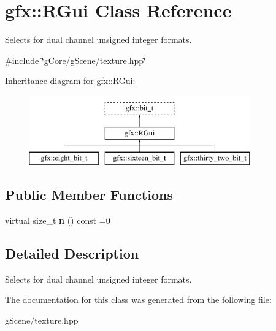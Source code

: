 \hypertarget{classgfx_1_1RGui}{\section{gfx\-:\-:R\-Gui Class Reference}
\label{classgfx_1_1RGui}
}


Selects for dual channel unsigned integer formats.  




{\ttfamily \#include \char`\"{}g\-Core/g\-Scene/texture.\-hpp\char`\"{}}

Inheritance diagram for gfx\-:\-:R\-Gui\-:\begin{figure}[H]
\begin{center}
\leavevmode
\includegraphics[height=3.000000cm]{classgfx_1_1RGui}
\end{center}
\end{figure}
\subsection*{Public Member Functions}
\begin{DoxyCompactItemize}
\item 
\hypertarget{classgfx_1_1RGui_af80bb91ee2f476a3d7d47276e19f7ffa}{virtual size\-\_\-t {\bfseries n} () const =0}\label{classgfx_1_1RGui_af80bb91ee2f476a3d7d47276e19f7ffa}

\end{DoxyCompactItemize}


\subsection{Detailed Description}
Selects for dual channel unsigned integer formats. 

The documentation for this class was generated from the following file\-:\begin{DoxyCompactItemize}
\item 
g\-Scene/texture.\-hpp\end{DoxyCompactItemize}
